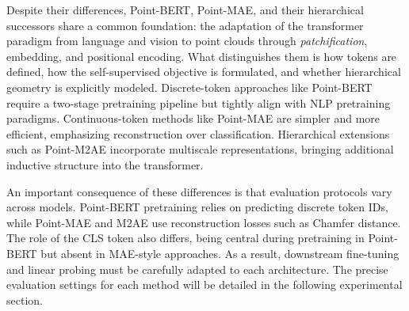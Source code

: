 Despite their differences, Point-BERT, Point-MAE, and their hierarchical successors share a common foundation: the adaptation of the transformer paradigm from language and vision to point clouds through \textit{patchification}, embedding, and positional encoding. What distinguishes them is how tokens are defined, how the self-supervised objective is formulated, and whether hierarchical geometry is explicitly modeled. Discrete-token approaches like Point-BERT require a two-stage pretraining pipeline but tightly align with NLP pretraining paradigms. Continuous-token methods like Point-MAE are simpler and more efficient, emphasizing reconstruction over classification. Hierarchical extensions such as Point-M2AE incorporate multiscale representations, bringing additional inductive structure into the transformer.

An important consequence of these differences is that evaluation protocols vary across models. Point-BERT pretraining relies on predicting discrete token IDs, while Point-MAE and M2AE use reconstruction losses such as Chamfer distance. The role of the CLS token also differs, being central during pretraining in Point-BERT but absent in MAE-style approaches. As a result, downstream fine-tuning and linear probing must be carefully adapted to each architecture. The precise evaluation settings for each method will be detailed in the following experimental section.